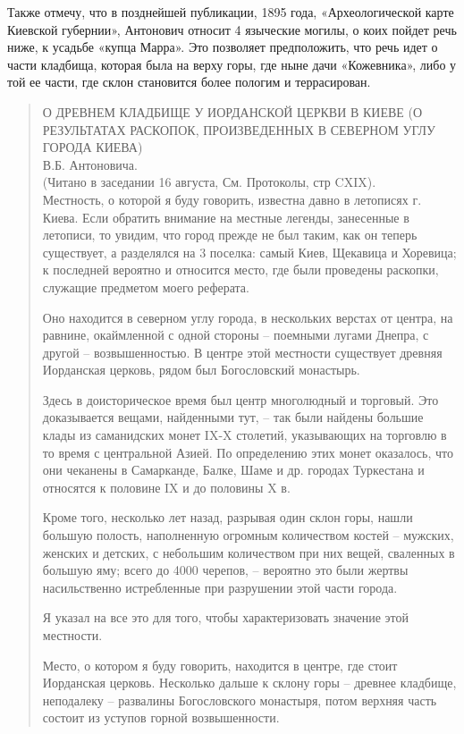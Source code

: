 Также отмечу, что в позднейшей публикации, 1895 года, «Археологической карте Киевской губернии», Антонович относит 4 языческие могилы, о коих пойдет речь ниже, к усадьбе «купца Марра». Это позволяет предположить, что речь идет о части кладбища, которая была на верху горы, где ныне дачи «Кожевника», либо у той ее части, где склон становится более пологим и террасирован.

\begin{quotation}
О ДРЕВНЕМ КЛАДБИЩЕ У ИОРДАНСКОЙ ЦЕРКВИ В КИЕВЕ (О РЕЗУЛЬТАТАХ РАСКОПОК, ПРОИЗВЕДЕННЫХ В СЕВЕРНОМ УГЛУ ГОРОДА КИЕВА)\\

В.Б. Антоновича.\\

(Читано в заседании 16 августа, См. Протоколы, стр CXIX).\\

Местность, о которой я буду говорить, известна давно в летописях г. Киева. Если обратить внимание на местные легенды, занесенные в летописи, то увидим, что город прежде не был таким, как он теперь существует, а разделялся на 3 поселка: самый Киев, Щекавица и Хоревица; к последней вероятно и относится место, где были проведены раскопки, служащие предметом моего реферата.

Оно находится в северном углу города, в нескольких верстах от центра, на равнине, ока\-ймленной с одной стороны – поемными лугами Днепра, с другой – возвышенностью. В центре этой местности существует древняя Иорданская церковь, рядом был Богословский монастырь.

Здесь в доисторическое время был центр многолюдный и торговый. Это доказывается вещами, найденными тут, – так были найдены большие клады из саманидских монет IX-X столетий, указывающих на торговлю в то время с центральной Азией. По определению этих монет оказалось, что они чеканены в Самарканде, Балке, Шаме и др. городах Туркестана и относятся к половине IX и до половины X в. 

Кроме того, несколько лет назад, разрывая один склон горы, нашли большую полость, наполненную огромным количеством костей – мужских, женских и детских, с небольшим количеством при них вещей, сваленных в большую яму; всего до 4000 черепов, – вероятно это были жертвы насильственно истребленные при разрушении этой части города.

Я указал на все это для того, чтобы характеризовать значение этой местности.

Место, о котором я буду говорить, находится в центре, где стоит Иорданская церковь. Несколько дальше к склону горы – древнее кладбище, неподалеку – развалины Богословского монастыря, потом верхняя часть состоит из уступов горной возвышенности.


\end{quotation}
